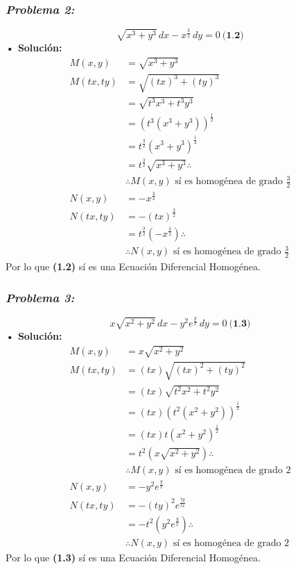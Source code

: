 \documentclass[letterpaper, 12pt]{article}
\begin{document}
\subsubsection*{\emph{Problema 2:}}
\[\sqrt{x^3+y^3}\, dx-x^{\frac{3}{2}}\, dy=0\: \textbf{(1.2)}\]
\justify
\textbf{ • Solución:}
\begin{equation*}
    \begin{aligned}
        M(x,y)&=\sqrt{x^3+y^3}\\[5pt]
        M(tx,ty)&=\sqrt{(tx)^3+(ty)^3}\\[5pt]
                &=\sqrt{t^3x^3+t^3y^3}\\[5pt]
                &=\left(t^3(x^3+y^3)\right)^{\frac{1}{2}}\\[5pt]
                &=t^{\frac{3}{2}}\left(x^3+y^3\right)^{\frac{1}{2}}\\[5pt]
                &=t^{\frac{3}{2}}\sqrt{x^3+y^3}\therefore\\[5pt]
                &\therefore M(x,y) \text{ sí es homogénea de grado } \frac{3}{2}\\[10pt]
        N(x,y)&=-x^{\frac{3}{2}}\\[5pt]
        N(tx,ty)&=-(tx)^{\frac{3}{2}}\\[5pt]
                &=t^{\frac{3}{2}}\left(-x^\frac{3}{2}\right)\therefore\\[5pt]
                &\therefore N(x,y) \text{ sí es homogénea de grado } \frac{3}{2}
    \end{aligned}
\end{equation*}
Por lo que \textbf{(1.2)} sí es una Ecuación Diferencial Homogénea.
\newpage
\subsubsection*{\emph{Problema 3:}}
\[x\sqrt{x^2+y^2}\, dx-y^2e^{\frac{y}{x}}\, dy=0\: \textbf{(1.3)}\]
\justify
\textbf{ • Solución:}
\begin{equation*}
    \begin{aligned}
        M(x,y)&=x\sqrt{x^2+y^2}\\[5pt]
        M(tx,ty)&=(tx)\sqrt{(tx)^2+(ty)^2}\\[5pt]
                &=(tx)\sqrt{t^2x^2+t^2y^2}\\[5pt]
                &=(tx)\left(t^2(x^2+y^2)\right)^{\frac{1}{2}}\\[5pt]
                &=(tx)t\left(x^2+y^2\right)^{\frac{1}{2}}\\[5pt]
                &=t^2\left(x\sqrt{x^2+y^2}\right)\therefore\\[5pt]
                &\therefore M(x,y) \text{ sí es homogénea de grado } 2\\[10pt]
        N(x,y)&=-y^2e^{\frac{y}{x}}\\[5pt]
        N(tx,ty)&=-(ty)^2e^{\frac{ty}{tx}}\\[5pt]
                &=-t^2\left(y^2e^{\frac{y}{x}}\right)\therefore\\[5pt]
                &\therefore N(x,y) \text{ sí es homogénea de grado } 2
    \end{aligned}
\end{equation*}
Por lo que \textbf{(1.3)} sí es una Ecuación Diferencial Homogénea.
\end{document}
